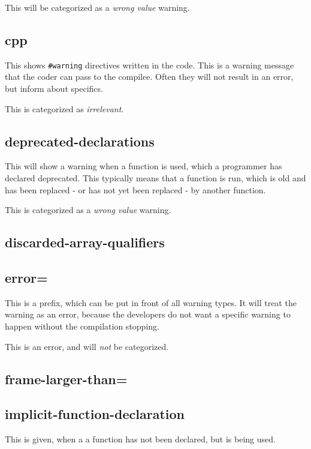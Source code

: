 \documentclass[a4paper,11pt]{report}
\newcommand{\textcode}[1]{\fboxsep=1pt\texttt{\colorbox{gray!20}{#1}}}
\newcommand{\figa}{
    \begin{figure}[!htpb]
    \centering
}
\newcommand{\figb}[2]{
    \caption{#1}
    \label{#2}
    \end{figure}
}
\begin{document}
This will be categorized as a \emph{wrong value} warning.




            \subsection*{cpp}
This shows \textcode{\#warning} directives written in the code. This is a warning
message that the coder can pass to the compilee. Often they will not result in 
an error, but inform about specifics.

This is categorized as \emph{irrelevant}.


            \subsection*{deprecated-declarations}
This will show a warning when a function is used, which a programmer has 
declared deprecated. This typically means that a function is run, which is old
and has been replaced - or has not yet been replaced - by another function.

This is categorized as a \emph{wrong value} warning.


            \subsection*{discarded-array-qualifiers}


            \subsection*{error=}
This is a prefix, which can be put in front of all warning types. It 
will treat the warning as an error, because the developers do not want a 
specific warning to happen without the compilation stopping. 

This is an error, and will \emph{not} be categorized.


            \subsection*{frame-larger-than=}


            \subsection*{implicit-function-declaration}
This is given, when a a function has not been declared, but is being used.
\end{document}
